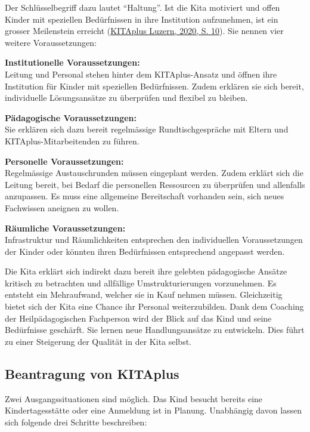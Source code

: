 \documentclass[
  ngerman,
  11pt,
  paper=a4,
  twoside,
  titlepage=true,
  openright,
  abstract=on,
  toc=listofnumbered,
  numbers=noenddot,
  chapterprefix=true,
  headings=optiontohead,
  svgnames,
  dvipsnames]{scrreprt}
\begin{document}
Der Schlüsselbegriff dazu lautet “Haltung”. Ist die Kita motiviert und
offen Kinder mit speziellen Bedürfnissen in ihre Institution
aufzunehmen, ist ein grosser Meilenstein erreicht
(\protect\hyperlink{ref-konzeptKitaPlus}{KITAplus Luzern, 2020, S. 10}).
Sie nennen vier weitere Voraussetzungen:

\textbf{Institutionelle Voraussetzungen:}\\
Leitung und Personal stehen hinter dem KITAplus-Ansatz und öffnen ihre
Institution für Kinder mit speziellen Bedürfnissen. Zudem erklären sie
sich bereit, individuelle Lösungsansätze zu überprüfen und flexibel zu
bleiben.

\textbf{Pädagogische Voraussetzungen:}\\
Sie erklären sich dazu bereit regelmässige Rundtischgespräche mit Eltern
und KITAplus-Mitarbeitenden zu führen.

\textbf{Personelle Voraussetzungen:}\\
Regelmässige Austauschrunden müssen eingeplant werden. Zudem erklärt
sich die Leitung bereit, bei Bedarf die personellen Ressourcen zu
überprüfen und allenfalls anzupassen. Es muss eine allgemeine
Bereitschaft vorhanden sein, sich neues Fachwissen aneignen zu wollen.

\textbf{Räumliche Voraussetzungen:}\\
Infrastruktur und Räumlichkeiten entsprechen den individuellen
Voraussetzungen der Kinder oder könnten ihren Bedürfnissen entsprechend
angepasst werden.

Die Kita erklärt sich indirekt dazu bereit ihre gelebten pädagogische
Ansätze kritisch zu betrachten und allfällige Umstrukturierungen
vorzunehmen. Es entsteht ein Mehraufwand, welcher sie in Kauf nehmen
müssen. Gleichzeitig bietet sich der Kita eine Chance ihr Personal
weiterzubilden. Dank dem Coaching der Heilpädagogischen Fachperson wird
der Blick auf das Kind und seine Bedürfnisse geschärft. Sie lernen neue
Handlungsansätze zu entwickeln. Dies führt zu einer Steigerung der
Qualität in der Kita selbst.

\hypertarget{beantragung-von-kitaplus}{%
\subsection{Beantragung von KITAplus}\label{beantragung-von-kitaplus}}

Zwei Ausgangssituationen sind möglich. Das Kind besucht bereits eine
Kindertagesstätte oder eine Anmeldung ist in Planung. Unabhängig davon
lassen sich folgende drei Schritte beschreiben:
\end{document}
